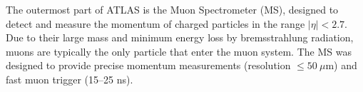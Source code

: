 



The outermost part of ATLAS is the Muon Spectrometer (MS), designed to detect and measure the momentum of charged particles in the range $|\eta| < 2.7$. Due to their large mass and minimum energy loss by bremsstrahlung radiation, muons are typically the only particle that enter the muon system\@. The MS was designed to provide precise momentum measurements (resolution $\leq 50 ~\mu$m) and fast muon trigger (15--25 ns). 

